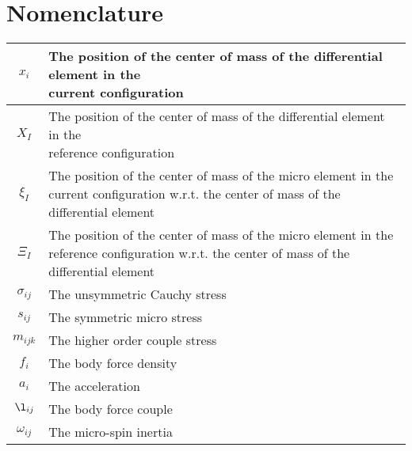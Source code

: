 \section{Nomenclature}

\begin{table}[htb!]
\centering
\begin{tabular}{|c|l|}
\hline
$x_i$ & \thead{The position of the center of mass of the differential element in the\\ current configuration}\\
\hline
$X_I$ & \thead{The position of the center of mass of the differential element in the\\ reference configuration}\\
\hline
$\xi_I$ & \thead{The position of the center of mass of the micro element in the\\ current configuration w.r.t. the center of mass of the differential element}\\
\hline
$\Xi_I$ & \thead{The position of the center of mass of the micro element in the\\ reference configuration w.r.t. the center of mass of the differential element}\\
\hline
$\sigma_{ij}$ & The unsymmetric Cauchy stress\\
\hline
$s_{ij}$ & The symmetric micro stress\\
\hline
$m_{ijk}$ & The higher order couple stress\\
\hline
$f_{i}$ & The body force density\\
\hline
$a_{i}$ & The acceleration\\
\hline
$\l_{ij}$ & The body force couple\\
\hline
$\omega_{ij}$ & The micro-spin inertia\\
\hline
\end{tabular}
\end{table}

\FloatBarrier